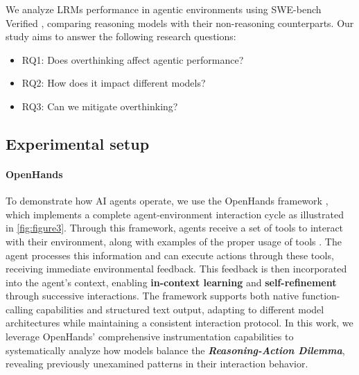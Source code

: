 
We analyze LRMs performance in agentic environments using SWE-bench Verified \cite{swebench_verified}, comparing reasoning models with their non-reasoning counterparts. Our study aims to answer the following research questions:
\begin{itemize}
    \item RQ1: Does overthinking affect agentic performance?
    \item RQ2: How does it impact different models?
    \item RQ3: Can we mitigate overthinking?
\end{itemize}

\subsection{Experimental setup}


\paragraph{OpenHands} To demonstrate how AI agents operate, we use the OpenHands framework \cite{wang2024openhandsopenplatformai}, which implements a complete agent-environment interaction cycle as illustrated in \cref{fig:figure3}. Through this framework, agents receive a set of tools to interact with their environment, along with examples of the proper usage of tools \cite{wang2024executablecodeactionselicit}. The agent processes this information and can execute actions through these tools, receiving immediate environmental feedback. This feedback is then incorporated into the agent's context, enabling \textbf{in-context learning} \cite{dong2024surveyincontextlearning} and \textbf{self-refinement} \cite{madaan2023selfrefineiterativerefinementselffeedback} through successive interactions. The framework supports both native function-calling capabilities \cite{openai_function_calling} and structured text output, adapting to different model architectures while maintaining a consistent interaction protocol. In this work, we leverage OpenHands' comprehensive instrumentation capabilities to systematically analyze how models balance the \textbf{\textit{Reasoning-Action Dilemma}}, revealing previously unexamined patterns in their interaction behavior.


